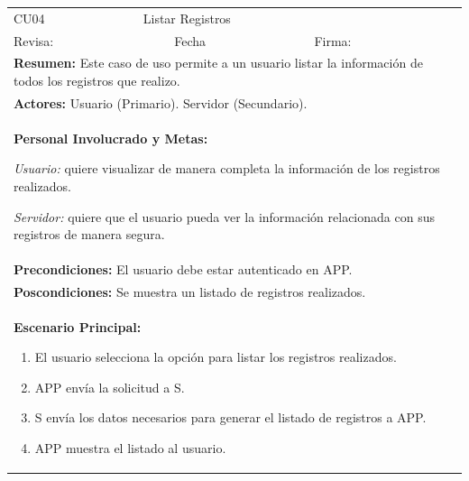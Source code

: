 \begin{longtable}{|l|p{5.5cm}|l|p{2cm}|l|p{1.9cm}|} \hline
    \cellcolor{grisOscuro} CU04 & \multicolumn{4}{|l|}{  \cellcolor{grisOscuro} Listar Registros} &  \cellcolor{grisClaro}\multirow{2}{1cm}{} \\ \cline{1-5}
    \cellcolor{grisOscuro} Revisa: &  \cellcolor{grisClaro} &  \cellcolor{grisOscuro} Fecha &  \cellcolor{grisClaro} &  \cellcolor{grisOscuro} Firma: & \cellcolor{grisClaro} \\ \hline
    \multicolumn{6}{|p{15cm}|}{ \textbf{Resumen: } Este caso de uso permite a un usuario listar la información de todos los registros que realizo.

    } \\ \hline

    \multicolumn{6}{|p{15cm}|}{ \textbf{Actores: } Usuario (Primario). Servidor (Secundario).

    } \\ \hline

    \multicolumn{6}{|p{15cm}|}{ \textbf{Personal Involucrado y Metas: }

    \emph{Usuario:} quiere visualizar de manera completa la información de los registros realizados.

    \emph{Servidor:} quiere que el usuario pueda ver la información relacionada con sus registros de manera segura.

    } \\ \hline

    \multicolumn{6}{|p{15cm}|}{ \textbf{Precondiciones: } El usuario debe estar autenticado en APP.

    } \\ \hline

    \multicolumn{6}{|p{15cm}|}{ \textbf{Poscondiciones: } Se muestra un listado de registros realizados.

    } \\ \hline

    \multicolumn{6}{|p{15cm}|}{ \textbf{Escenario Principal: }

    \begin{enumerate}
        \item El usuario selecciona la opción para listar los registros realizados.
        \item APP envía la solicitud a S.
        \item S envía los datos necesarios para generar el listado de registros a APP.
        \item APP muestra el listado al usuario.
    \end{enumerate}

}
\end{longtable}
